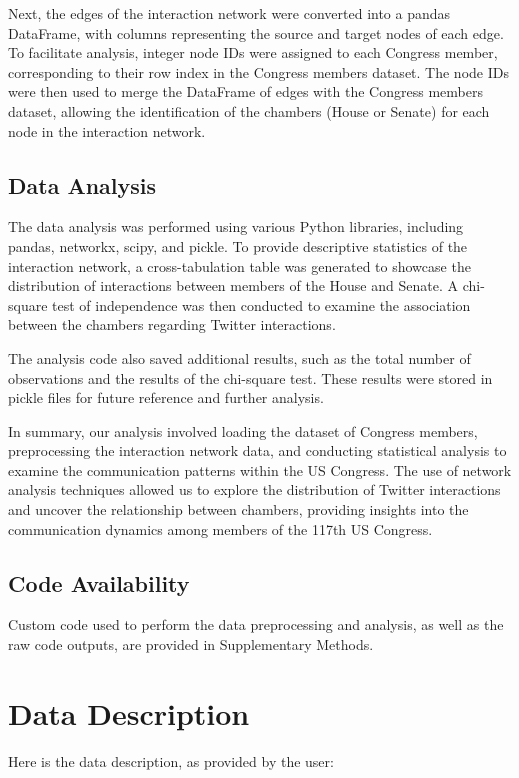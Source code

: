 \documentclass[11pt]{article}
\begin{document}
Next, the edges of the interaction network were converted into a pandas DataFrame, with columns representing the source and target nodes of each edge. To facilitate analysis, integer node IDs were assigned to each Congress member, corresponding to their row index in the Congress members dataset. The node IDs were then used to merge the DataFrame of edges with the Congress members dataset, allowing the identification of the chambers (House or Senate) for each node in the interaction network.

\subsection*{Data Analysis}
The data analysis was performed using various Python libraries, including pandas, networkx, scipy, and pickle. To provide descriptive statistics of the interaction network, a cross-tabulation table was generated to showcase the distribution of interactions between members of the House and Senate. A chi-square test of independence was then conducted to examine the association between the chambers regarding Twitter interactions.

The analysis code also saved additional results, such as the total number of observations and the results of the chi-square test. These results were stored in pickle files for future reference and further analysis.

In summary, our analysis involved loading the dataset of Congress members, preprocessing the interaction network data, and conducting statistical analysis to examine the communication patterns within the US Congress. The use of network analysis techniques allowed us to explore the distribution of Twitter interactions and uncover the relationship between chambers, providing insights into the communication dynamics among members of the 117th US Congress.\subsection*{Code Availability}

Custom code used to perform the data preprocessing and analysis, as well as the raw code outputs, are provided in Supplementary Methods.


\clearpage
\appendix

\section{Data Description} \label{sec:data_description} Here is the data description, as provided by the user:
\end{document}
